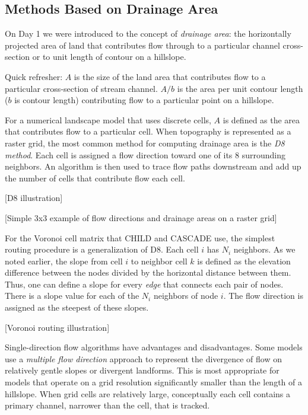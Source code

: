 \documentclass[12pt]{amsart}
\begin{document}
\subsection{Methods Based on Drainage Area}

On Day 1 we were introduced to the concept of {\em drainage area}: the horizontally projected area of land that contributes flow through to a particular channel cross-section or to unit length of contour on a hillslope.

Quick refresher: $A$ is the size of the land area that contributes flow to a particular cross-section of stream channel. $A/b$ is the area per unit contour length ($b$ is contour length) contributing flow to a particular point on a hillslope.

For a numerical landscape model that uses discrete cells, $A$ is defined as the area that contributes flow to a particular cell. When topography is represented as a raster grid, the most common method for computing drainage area is the {\em D8 method}. Each cell is assigned a flow direction toward one of its 8 surrounding neighbors. An algorithm is then used to trace flow paths downstream and add up the number of cells that contribute flow each cell.

[D8 illustration]

[Simple 3x3 example of flow directions and drainage areas on a raster grid]

For the Voronoi cell matrix that CHILD and CASCADE use, the simplest routing procedure is a generalization of D8. Each cell $i$ has $N_i$ neighbors. As we noted earlier, the slope from cell $i$ to neighbor cell $k$ is defined as the elevation difference between the nodes divided by the horizontal distance between them. Thus, one can define a slope for every {\em edge} that connects each pair of nodes. There is a slope value for each of the $N_i$ neighbors of node $i$. The flow direction is assigned as the steepest of these slopes.

[Voronoi routing illustration]

Single-direction flow algorithms have advantages and disadvantages. Some models use a {\em multiple flow direction} approach to represent the divergence of flow on relatively gentle slopes or divergent landforms. This is most appropriate for models that operate on a grid resolution significantly smaller than the length of a hillslope. When grid cells are relatively large, conceptually each cell contains a primary channel, narrower than the cell, that is tracked.
\end{document}
